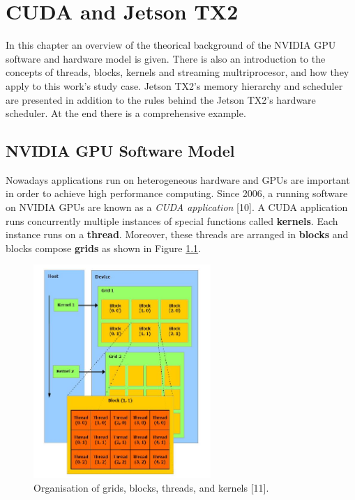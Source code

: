 \documentclass[
  12pt,
  a4paperpaper,
]{report}
\begin{document}
\hypertarget{cuda-and-jetson-tx2}{%
\chapter{CUDA and Jetson TX2}\label{cuda-and-jetson-tx2}}

In this chapter an overview of the theorical background of
the NVIDIA GPU software and hardware model is given. 
There is also an introduction to the concepts of threads, blocks, kernels and streaming multriprocesor, and how they apply to this work's study case.
Jetson TX2's memory hierarchy and scheduler are presented in addition to the rules behind the Jetson TX2's hardware scheduler. At the end there is a comprehensive example.

\hypertarget{nvidia-gpu-software-model}{%
\section{NVIDIA GPU Software Model}\label{nvidia-gpu-software-model}}

Nowadays applications run on heterogeneous hardware and GPUs
are important in order to achieve high performance computing. Since 2006,
a running software on NVIDIA GPUs are known as a \emph{CUDA application}
{[}10{]}. A CUDA application runs concurrently multiple instances of
special functions called \textbf{kernels}. Each instance runs on a
\textbf{thread}. Moreover, these threads are arranged in
\textbf{blocks} and blocks compose \textbf{grids} as shown in Figure
\ref{img:sw_model_grids}.

\begin{figure}
\centering
\includegraphics[width=0.6\textwidth,height=\textheight]{source/figures/sw_model_grids.png}
\caption{Organisation of grids, blocks, threads, and kernels {[}11{]}.
\label{img:sw_model_grids}}
\end{figure}
\end{document}
